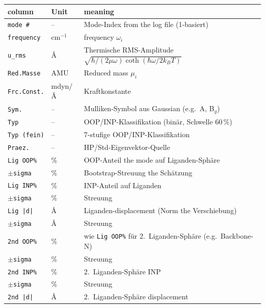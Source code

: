 \documentclass[11pt,a4paper,twoside]{article}
\providecommand{\angstrom}{\text{\AA}}    %
\theoremstyle{remark}
\begin{document}
\begin{center}
\small
\begin{tabular}{p{3.6cm}p{1.4cm}p{8.4cm}}
\toprule
\textbf{column} & \textbf{Unit} & \textbf{meaning} \\
\midrule
\texttt{mode \#}        & --       & Mode-Index from the log file (1-basiert) \\
\texttt{frequency}        & cm$^{-1}$ & frequency $\omega_i$ \\
\texttt{u\_rms}          & $\angstrom$ & Thermische RMS-Amplitude
                                       $\sqrt{\hbar/(2\mu\omega)\coth(\hbar\omega/2k_BT)}$ \\
\texttt{Red.Masse}       & AMU      & Reduced mass $\mu_i$ \\
\texttt{Frc.Const.}      & mdyn/$\angstrom$ & Kraftkonstante \\
\texttt{Sym.}            & --       & Mulliken-Symbol aus Gaussian (e.g.\ A, B$_g$) \\
\texttt{Typ}             & --       & OOP/INP-Klassifikation
                                       (bin\"ar, Schwelle 60\,\%) \\
\texttt{Typ (fein)}      & --       & 7-stufige OOP/INP-Klassifikation \\
\texttt{Praez.}          & --       & HP/Std-Eigenvektor-Quelle \\
\texttt{Lig OOP\%}       & \%       & OOP-Anteil the mode auf
                                       Liganden-Sph\"are \\
\texttt{$\pm$sigma}      & \%       & Bootstrap-Streuung the Sch\"atzung \\
\texttt{Lig INP\%}       & \%       & INP-Anteil auf Liganden \\
\texttt{$\pm$sigma}      & \%       & Streuung \\
\texttt{Lig |d|}         & $\angstrom$ & Liganden-displacement
                                          (Norm the Verschiebung) \\
\texttt{$\pm$sigma}      & $\angstrom$ & Streuung \\
\texttt{2nd OOP\%}       & \%       & wie \texttt{Lig OOP\%} f\"ur
                                       2.\ Liganden-Sph\"are
                                       (e.g.\ Backbone-N) \\
\texttt{$\pm$sigma}      & \%       & Streuung \\
\texttt{2nd INP\%}       & \%       & 2.\ Liganden-Sph\"are INP \\
\texttt{$\pm$sigma}      & \%       & Streuung \\
\texttt{2nd |d|}         & $\angstrom$ & 2.\ Liganden-Sph\"are
                                          displacement \\
\bottomrule
\end{tabular}
\end{center}
\end{document}
